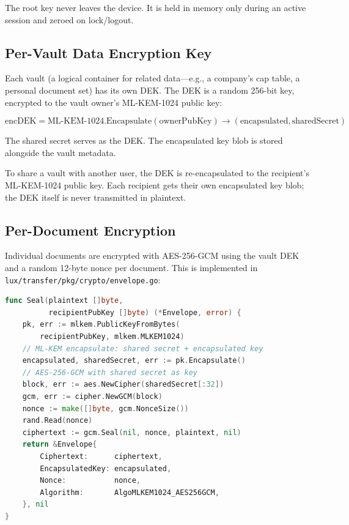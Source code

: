 \documentclass[11pt,a4paper]{article}
\begin{document}
The root key never leaves the device.  It is held in memory only during
an active session and zeroed on lock/logout.

\subsection{Per-Vault Data Encryption Key}

Each vault (a logical container for related data---e.g., a company's
cap table, a personal document set) has its own DEK.  The DEK is a random
256-bit key, encrypted to the vault owner's ML-KEM-1024 public key:

\begin{equation}
  \text{encDEK} = \text{ML-KEM-1024.Encapsulate}(\text{ownerPubKey}) \to (\text{encapsulated}, \text{sharedSecret})
\end{equation}

The shared secret serves as the DEK.  The encapsulated key blob is stored
alongside the vault metadata.

To share a vault with another user, the DEK is re-encapsulated to the
recipient's ML-KEM-1024 public key.  Each recipient gets their own
encapsulated key blob; the DEK itself is never transmitted in plaintext.

\subsection{Per-Document Encryption}

Individual documents are encrypted with AES-256-GCM using the vault DEK
and a random 12-byte nonce per document.  This is implemented in
\texttt{lux/transfer/pkg/crypto/envelope.go}:

\begin{lstlisting}[language=Go,caption={envelope.go: ML-KEM + AES-256-GCM envelope}]
func Seal(plaintext []byte,
          recipientPubKey []byte) (*Envelope, error) {
    pk, err := mlkem.PublicKeyFromBytes(
        recipientPubKey, mlkem.MLKEM1024)
    // ML-KEM encapsulate: shared secret + encapsulated key
    encapsulated, sharedSecret, err := pk.Encapsulate()
    // AES-256-GCM with shared secret as key
    block, err := aes.NewCipher(sharedSecret[:32])
    gcm, err := cipher.NewGCM(block)
    nonce := make([]byte, gcm.NonceSize())
    rand.Read(nonce)
    ciphertext := gcm.Seal(nil, nonce, plaintext, nil)
    return &Envelope{
        Ciphertext:      ciphertext,
        EncapsulatedKey: encapsulated,
        Nonce:           nonce,
        Algorithm:       AlgoMLKEM1024_AES256GCM,
    }, nil
}
\end{lstlisting}
\end{document}
